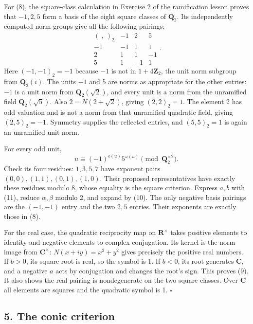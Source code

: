 \documentclass[11pt,a4paper]{article}
\begin{document}
For (8), the square-class calculation in Exercise 2 of the ramification
lesson proves that \(-1,2,5\) form a basis of the eight square classes
of \(\mathbf Q_2\). Its independently computed norm groups give all the
following pairings: \[
\begin{array}{c|ccc}
(\ ,\ )_2&-1&2&5\\ \hline
-1&-1&1&1\\
2&1&1&-1\\
5&1&-1&1
\end{array}.
\tag{10}
\] Here \((-1,-1)_2=-1\) because \(-1\) is not in \(1+4\mathbf Z_2\),
the unit norm subgroup from \(\mathbf Q_2(i)\). The units \(-1\) and 5
are norms as appropriate for the other entries: \(-1\) is a unit norm
from \(\mathbf Q_2(\sqrt2)\), and every unit is a norm from the
unramified field \(\mathbf Q_2(\sqrt5)\). Also \(2=N(2+\sqrt2)\), giving
\((2,2)_2=1\). The element 2 has odd valuation and is not a norm from
that unramified quadratic field, giving \((2,5)_2=-1\). Symmetry
supplies the reflected entries, and \((5,5)_2=1\) is again an unramified
unit norm.

For every odd unit, \[
u\equiv(-1)^{\epsilon(u)}5^{\omega(u)}
\pmod{\mathbf Q_2^{\times2}}.
\tag{11}
\] Check its four residues: \(1,3,5,7\) have exponent pairs
\((0,0),(1,1),(0,1),(1,0)\). Their proposed representatives have exactly
these residues modulo 8, whose equality is the square criterion. Express
\(a,b\) with (11), reduce \(\alpha,\beta\) modulo 2, and expand by (10).
The only negative basis pairings are the \((-1,-1)\) entry and the two
\(2,5\) entries. Their exponents are exactly those in (8).

For the real case, the quadratic reciprocity map on \(\mathbf R^\times\)
takes positive elements to identity and negative elements to complex
conjugation. Its kernel is the norm image from \(\mathbf C^\times\):
\(N(x+iy)=x^2+y^2\) gives precisely the positive real numbers. If
\(b>0\), its square root is real, so the symbol is 1. If \(b<0\), its
root generates \(\mathbf C\), and a negative \(a\) acts by conjugation
and changes the root's sign. This proves (9). It also shows the real
pairing is nondegenerate on the two square classes. Over \(\mathbf C\)
all elements are squares and the quadratic symbol is 1. \(\square\)

\subsection{5. The conic criterion}\label{the-conic-criterion}
\end{document}

